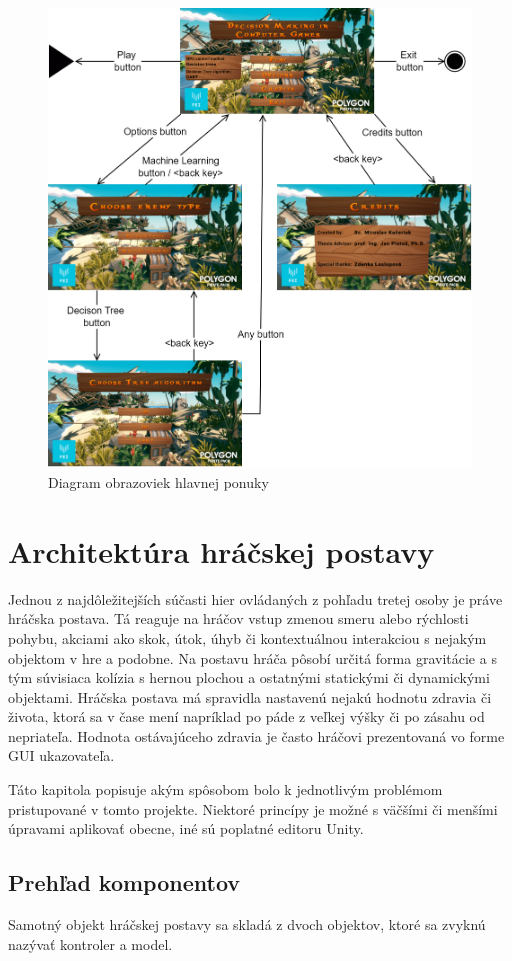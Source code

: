 \documentclass[slovak, master]{diploma}
\begin{document}
\begin{figure}[!htbp]
	\centering
	\includegraphics[width=.85\textwidth]{Figures/mainMenuScheme.png}
	\caption{Diagram obrazoviek hlavnej ponuky}
	\label{pic:MainMenuScheme}
\end{figure}

\chapter{Architektúra hráčskej postavy}
\label{sec:Player}
Jednou z najdôležitejších súčasti hier ovládaných z pohľadu tretej osoby je práve hráčska postava. Tá reaguje na hráčov vstup zmenou smeru alebo rýchlosti pohybu, akciami ako skok, útok, úhyb či kontextuálnou interakciou s nejakým objektom v hre a podobne. Na postavu hráča pôsobí určitá forma gravitácie a s tým súvisiaca kolízia s hernou plochou a ostatnými statickými či dynamickými objektami. Hráčska postava má spravidla nastavenú nejakú hodnotu zdravia či života, ktorá sa v čase mení napríklad po páde z veľkej výšky či po zásahu od nepriateľa. Hodnota ostávajúceho zdravia je často hráčovi prezentovaná vo forme GUI ukazovateľa. 

Táto kapitola popisuje akým spôsobom bolo k jednotlivým problémom pristupované v tomto projekte. Niektoré princípy je možné s väčšími či menšími úpravami aplikovať obecne, iné sú poplatné editoru Unity. 

\section{Prehľad komponentov}
\label{sec:PlayerComponentOverview} 
Samotný objekt hráčskej postavy sa skladá z dvoch objektov, ktoré sa zvyknú nazývať kontroler a model. 
\end{document}
